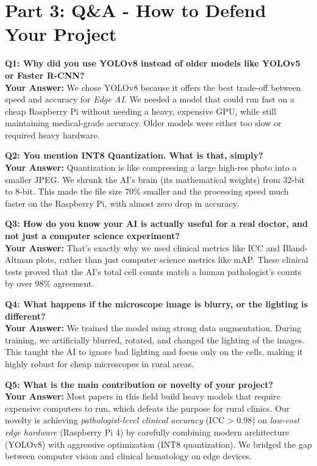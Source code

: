 \documentclass[12pt]{article}
\begin{document}
\newpage
\section*{Part 3: Q\&A - How to Defend Your Project}

\textbf{Q1: Why did you use YOLOv8 instead of older models like YOLOv5 or Faster R-CNN?} \\
\textbf{Your Answer:} We chose YOLOv8 because it offers the best trade-off between speed and accuracy for \textit{Edge AI}. We needed a model that could run fast on a cheap Raspberry Pi without needing a heavy, expensive GPU, while still maintaining medical-grade accuracy. Older models were either too slow or required heavy hardware.

\textbf{Q2: You mention INT8 Quantization. What is that, simply?} \\
\textbf{Your Answer:} Quantization is like compressing a large high-res photo into a smaller JPEG. We shrunk the AI's brain (its mathematical weights) from 32-bit to 8-bit. This made the file size 70\% smaller and the processing speed much faster on the Raspberry Pi, with almost zero drop in accuracy.

\textbf{Q3: How do you know your AI is actually useful for a real doctor, and not just a computer science experiment?} \\
\textbf{Your Answer:} That's exactly why we used clinical metrics like ICC and Bland-Altman plots, rather than just computer science metrics like mAP. These clinical tests proved that the AI's total cell counts match a human pathologist's counts by over 98\% agreement. 

\textbf{Q4: What happens if the microscope image is blurry, or the lighting is different?} \\
\textbf{Your Answer:} We trained the model using strong data augmentation. During training, we artificially blurred, rotated, and changed the lighting of the images. This taught the AI to ignore bad lighting and focus only on the cells, making it highly robust for cheap microscopes in rural areas.

\textbf{Q5: What is the main contribution or novelty of your project?} \\
\textbf{Your Answer:} Most papers in this field build heavy models that require expensive computers to run, which defeats the purpose for rural clinics. Our novelty is achieving \textit{pathologist-level clinical accuracy} (ICC > 0.98) on \textit{low-cost edge hardware} (Raspberry Pi 4) by carefully combining modern architecture (YOLOv8) with aggressive optimization (INT8 quantization). We bridged the gap between computer vision and clinical hematology on edge devices.
\end{document}
